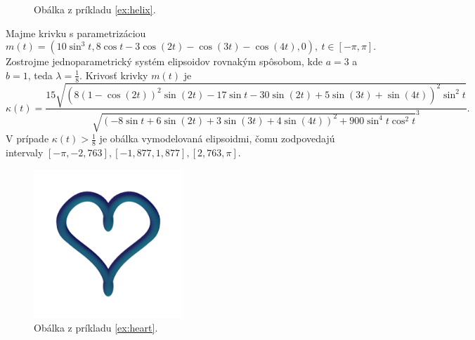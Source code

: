 \begin{example}[Skrutkovica]
\begin{figure}[H]
	\caption[Obálka z príkladu \ref{ex:helix}.]{Obálka z príkladu \ref{ex:helix}.}
\end{figure}
\end{example}
\begin{example}[Srdce]
\label{ex:heart}
Majme krivku s parametrizáciou 
$$m(t)=(10\sin^{3}t, 8 \cos t-3\cos(2t) -\cos(3t)-\cos (4t), 0), \  t \in [-\pi, \pi].$$ Zostrojme jednoparametrický systém elipsoidov rovnakým spôsobom, kde $a= 3$ a $b=1$, teda $\lambda = \frac{1}{8}.$
Krivosť krivky $m(t)$ je
$$
\kappa(t) = \frac{15 \sqrt{\left(8\left(1-\cos\left(2t\right)\right)^{2}\sin\left(2t\right)-17\sin t-30\sin\left(2t\right)+5\sin\left(3t\right)+\sin\left(4t\right)\right)^{2}\sin^{2}t}}
{\sqrt{(-8\sin t + 6 \sin (2t) + 3 \sin (3t) + 4 \sin (4t) ) ^ {2} + 900 \sin^{4} t \cos^{2} t}^{3}}.
$$
V prípade $\kappa(t) > \frac{1}{8}$ je obálka vymodelovaná elipsoidmi, čomu zodpovedajú intervaly $ [-\pi, -2,763], [-1,877, 1,877], [2,763, \pi]. $ 
\begin{figure}[h]
	\centering
	\includegraphics[width=0.5\textwidth]{images/heart_ellipsoids_envelope.png}
	\caption[Obálka z príkladu \ref{ex:heart}.]{Obálka z príkladu \ref{ex:heart}.}
\end{figure}
\end{example}
